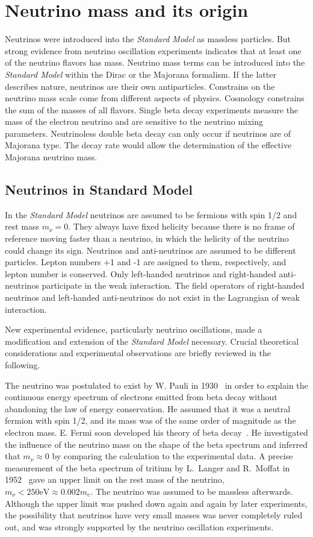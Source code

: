 \chapter{Neutrino mass and its origin}
\label{cha:theory}
Neutrinos were introduced into the \emph{Standard Model} as massless particles. But strong evidence from neutrino oscillation experiments indicates that at least one of the neutrino flavors has mass. Neutrino mass terms can be introduced into the \emph{Standard Model} within the Dirac or the Majorana formalism. If the latter describes nature, neutrinos are their own antiparticles. Constrains on the neutrino mass scale come from different aspects of physics. Cosmology constrains the sum of the masses of all flavors. Single beta decay experiments measure the mass of the electron neutrino and are sensitive to the neutrino mixing parameters. Neutrinoless double beta decay can only occur if neutrinos are of Majorana type. The decay rate would allow the determination of the effective Majorana neutrino mass.

\section{Neutrinos in Standard Model}
\label{sec:sm}
In the \emph{Standard Model} neutrinos are assumed to be fermions with spin 1/2 and rest mass $m_\nu=0$. They always have fixed helicity because there is no frame of reference moving faster than a neutrino, in which the helicity of the neutrino could change its sign. Neutrinos and anti-neutrinos are assumed to be different particles. Lepton numbers +1 and -1 are assigned to them, respectively, and lepton number is conserved. Only left-handed neutrinos and right-handed anti-neutrinos participate in the weak interaction. The field operators of right-handed neutrinos and left-handed anti-neutrinos do not exist in the Lagrangian of weak interaction.

New experimental evidence, particularly neutrino oscillations, made a modification and extension of the \emph{Standard Model} necessary. Crucial theoretical considerations and experimental observations are briefly reviewed in the following.

The neutrino was postulated to exist by W. Pauli in 1930~\cite{Pau30} in order to explain the continuous energy spectrum of electrons emitted from beta decay without abandoning the law of energy conservation. He assumed that it was a neutral fermion with spin 1/2, and its mass was of the same order of magnitude as the electron mass. E.  Fermi soon developed his theory of beta decay~\cite{Fer33,Fer34}. He investigated the influence of the neutrino mass on the shape of the beta spectrum and inferred that $m_\nu \approx 0$ by comparing the calculation to the experimental data. A precise measurement of the beta spectrum of tritium by L.~Langer and R.~Moffat in 1952~\cite{Lan52} gave an upper limit on the rest mass of the neutrino, $m_\nu < 250 \mbox{eV} \approx 0.002m_e$. The neutrino was assumed to be massless afterwards. Although the upper limit was pushed down again and again by later experiments, the possibility that neutrinos have very small masses was never completely ruled out, and was strongly supported by the neutrino oscillation experiments.

